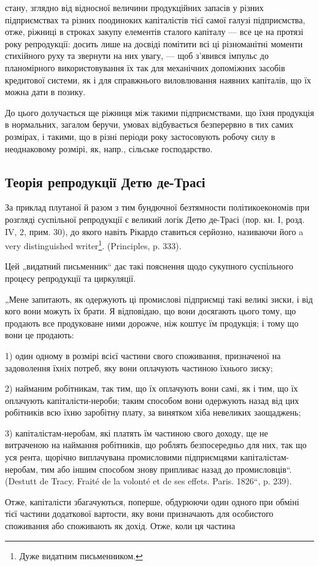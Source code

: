 \parcont{}  %
стану, зглядно від відносної величини продукційних запасів у різних
підприємствах та різних поодиноких капіталістів тієї самої галузі підприємства,
отже, ріжниці в строках закупу елементів сталого капіталу —
все це на протязі року репродукції: досить лише на досвіді помітити
всі ці різноманітні моменти стихійного руху та звернути на них увагу, —
щоб з’явився імпульс до планомірного використовування їх так для механічних
допоміжних засобів кредитової системи, як і для справжнього
виловлювання наявних капіталів, що їх можна дати в позику.

До цього долучається ще ріжниця між такими підприємствами, що
їхня продукція в нормальних, загалом беручи, умовах відбувається
безперервно в тих самих розмірах, і такими, що в різні періоди року
застосовують робочу силу в неоднаковому розмірі, як, напр., сільське
господарство.
\label{original-373-1}

\subsection[Теорія репродукції Детю де-Трасі]{Теорія репродукції Детю де-Трасі\footnotemark{}}

\label{original-373-2}
За%
приклад плутаної й разом з тим бундючної безтямности політикоекономів
при розгляді суспільної репродукції є великий логік Детю
де-Трасі (пор. кн. І, розд. IV, 2, прим. 30), до якого навіть Рікардо
ставиться серйозно, називаючи його a very distinguished writer\footnote*{
Дуже видатним письменником. 
}. (Principles,
p. 333).

Цей „видатний письменник“ дає такі пояснення щодо сукупного суспільного
процесу репродукції та циркуляції.

„Мене запитають, як одержують ці промислові підприємці такі великі
зиски, і від кого вони можуть їх брати. Я відповідаю, що вони досягають
цього тому, що продають все продуковане ними дорожче, ніж коштує
їм продукція; і тому що вони це продають:

1) один одному в розмірі всієї частини свого споживання, призначеної
на задоволення їхніх потреб, яку вони оплачують частиною їхнього
зиску;

2) найманим робітникам, так тим, що їх оплачують вони самі, як і тим, що їх
оплачують капіталісти-нероби; таким способом вони одержують назад від цих
робітників всю їхню заробітну плату, за винятком хіба невеликих заощаджень;

3) капіталістам-неробам, які платять їм частиною свого доходу, ще
не витраченою на наймання робітників, що роблять безпосередньо для
них, так що уся рента, щорічно виплачувана промисловими підприємцями
капіталістам-неробам, тим або іншим способом знову припливає
назад до промисловців“. (Destutt de Tracy. Fraité de la volonté et de ses
effets. Paris. 1826“, p. 239).

Отже, капіталісти збагачуються, поперше, обдурюючи один одного при
обміні тієї частини додаткової вартости, яку вони призначають для особистого
споживання або споживають як дохід. Отже, коли ця частина
\parbreak{}  %
